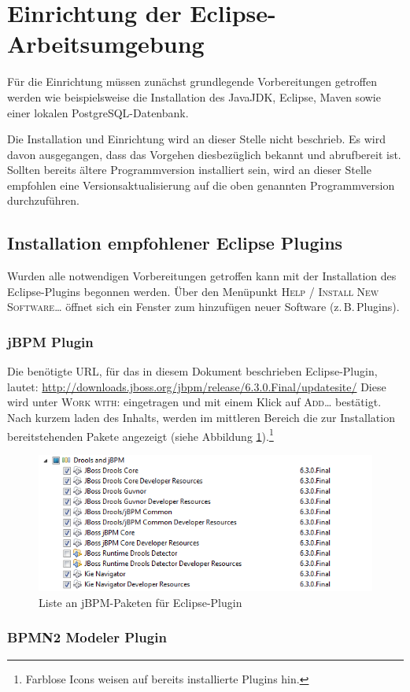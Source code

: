 \section{Einrichtung der Eclipse-Arbeitsumgebung}
Für die Einrichtung müssen zunächst grundlegende Vorbereitungen getroffen werden wie beispielsweise die Installation des JavaJDK, Eclipse, Maven sowie einer lokalen PostgreSQL-Datenbank.

Die Installation und Einrichtung wird an dieser Stelle nicht beschrieb. Es wird davon ausgegangen, dass das Vorgehen diesbezüglich bekannt und abrufbereit ist. Sollten bereits ältere Programmversion installiert sein, wird an dieser Stelle empfohlen eine Versionsaktualisierung auf die oben genannten Programmversion durchzuführen.

\subsection{Installation empfohlener Eclipse Plugins}
Wurden alle notwendigen Vorbereitungen getroffen kann mit der Installation des Eclipse-Plugins begonnen werden. Über den Menüpunkt \textsc{Help / Install New Software\ldots} öffnet sich ein Fenster zum hinzufügen neuer Software (z.\,B.\,Plugins).

\subsubsection{jBPM Plugin}
Die benötigte URL, für das in diesem Dokument beschrieben Eclipse-Plugin, lautet: \href{http://downloads.jboss.org/jbpm/release/6.3.0.Final/updatesite/}{http://downloads.jboss.org/jbpm/release/6.3.0.Final/updatesite/}
Diese wird unter \textsc{Work with:} eingetragen und mit einem Klick auf \textsc{Add\ldots} bestätigt. Nach kurzem laden des Inhalts, werden im mittleren Bereich die zur Installation bereitstehenden Pakete angezeigt (siehe Abbildung \ref{fig:install-jbpm-package-list}).\footnote{Farblose Icons weisen auf bereits installierte Plugins hin.}
\begin{figure}[h]
	\centering
	\includegraphics[width=\textwidth]{image/screenshots/install-jbpm-plugin}
	\caption{Liste an jBPM-Paketen für Eclipse-Plugin}\label{fig:install-jbpm-package-list}
\end{figure}

\subsubsection{BPMN2 Modeler Plugin}
